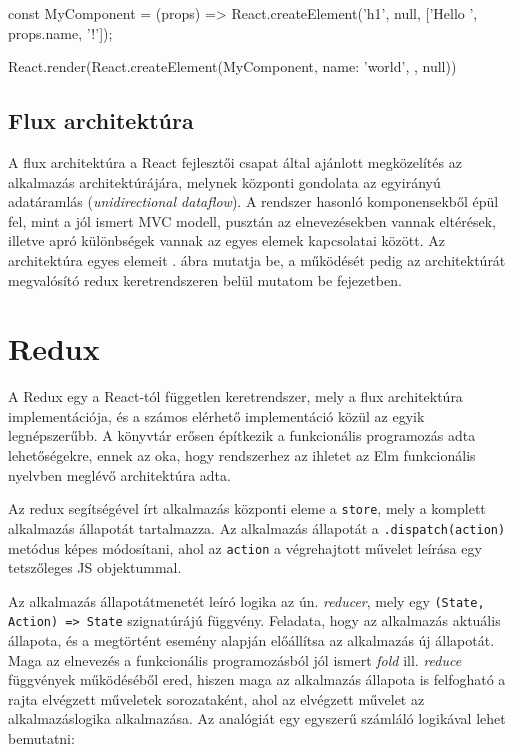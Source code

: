 \begin{js}
const MyComponent = (props) =>
  React.createElement('h1', null, ['Hello ', props.name, '!']);

React.render(React.createElement(MyComponent, {
  name: 'world',
}, null))
\end{js}

\subsection{Flux architektúra}

A flux architektúra\cite{flux} a React fejlesztői csapat által ajánlott
megközelítés az alkalmazás architektúrájára, melynek központi gondolata az
egyirányú adatáramlás (\emph{unidirectional dataflow}). A rendszer hasonló
komponensekből épül fel, mint a jól ismert MVC modell, pusztán az elnevezésekben
vannak eltérések, illetve apró különbségek vannak az egyes elemek kapcsolatai
között. Az architektúra egyes elemeit . ábra mutatja be, a
működését pedig az architektúrát megvalósító redux keretrendszeren belül mutatom
be  fejezetben.


\section{Redux}\label{sec:redux}

A Redux\cite{redux} egy a React-tól független keretrendszer, mely a flux
architektúra implementációja, és a számos elérhető implementáció közül az egyik
legnépszerűbb. A könyvtár erősen építkezik a funkcionális programozás adta
lehetőségekre, ennek az oka, hogy rendszerhez az ihletet az Elm funkcionális
nyelvben meglévő architektúra\cite{elmarch} adta.

Az redux segítségével írt alkalmazás központi eleme a \texttt{store}, mely a
komplett alkalmazás állapotát tartalmazza. Az alkalmazás állapotát a
\texttt{.dispatch(action)} metódus képes módosítani, ahol az \texttt{action} a
végrehajtott művelet leírása egy tetszőleges JS objektummal.

Az alkalmazás állapotátmenetét leíró logika az ún. \emph{reducer}, mely egy
\texttt{(State, Action) => State} szignatúrájú függvény. Feladata, hogy az
alkalmazás aktuális állapota, és a megtörtént esemény alapján előállítsa az
alkalmazás új állapotát. Maga az elnevezés a funkcionális programozásból jól
ismert \emph{fold} ill. \emph{reduce} függvények működéséből ered, hiszen maga
az alkalmazás állapota is felfogható a rajta elvégzett műveletek sorozataként,
ahol az elvégzett művelet az alkalmazáslogika alkalmazása. Az analógiát egy
egyszerű számláló logikával lehet bemutatni:

